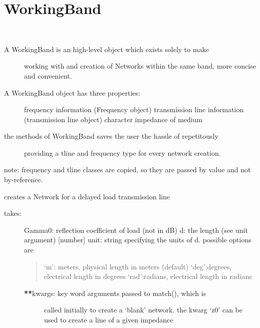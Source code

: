 \documentclass[letterpaper,10pt,english]{sphinxmanual}
\begin{document}
\section{WorkingBand}
\label{auto_workingband::doc}\label{auto_workingband:workingband}

\begin{fulllineitems}
\label{auto_workingband:mwavepy.WorkingBand}~\begin{description}
\item[{A WorkingBand is an high-level object which exists solely to make }] \leavevmode
working with and creation of Networks within the same band,
more concise and convenient.

\item[{A WorkingBand object has three properties: }] \leavevmode
frequency information (Frequency object)
transmission line information   (transmission line object)
character impedance of medium

\item[{the methods of WorkingBand saves the user the hassle of repetitously}] \leavevmode
providing a tline and frequency type for every network creation.

\end{description}

note: frequency and tline classes are copied, so they are passed
by value and not by-reference.

\begin{fulllineitems}
\label{auto_workingband:mwavepy.WorkingBand.delay_load}
creates a Network for a delayed load transmission line
\begin{description}
\item[{takes:}] \leavevmode
Gamma0: reflection coefficient of load (not in dB)
d: the length (see unit argument) {[}number{]}
unit: string specifying the units of d. possible options are
\begin{quote}

`m': meters, physical length in meters (default)
`deg':degrees, electrical length in degrees
`rad':radians, electrical length in radians
\end{quote}
\begin{description}
\item[{{\color{red}\bfseries{}**}kwargs: key word arguments passed to match(), which is }] \leavevmode
called initially to create a `blank' network. the kwarg
`z0' can be used to create a line of a given impedance


\end{description}
\end{description}
\end{fulllineitems}
\end{fulllineitems}
\end{document}
